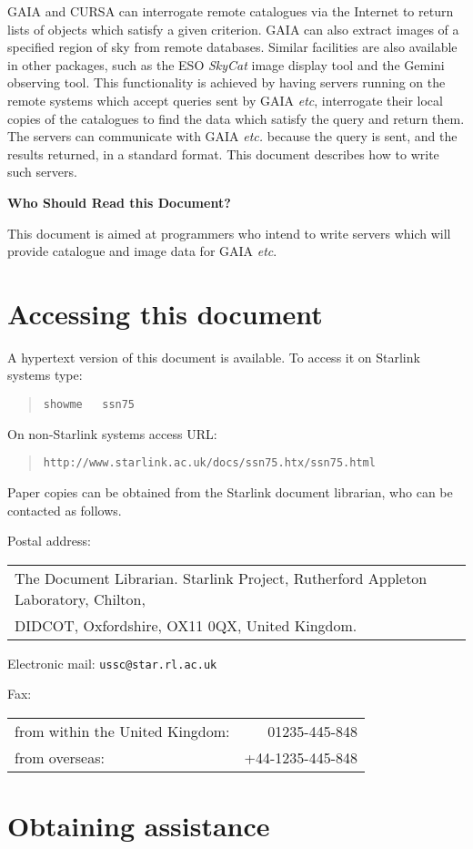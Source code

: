 \documentclass[twoside,11pt]{article}
\newcommand{\stardocabstract}
{GAIA and CURSA can interrogate remote catalogues via the Internet to
return lists of objects which satisfy a given criterion.  GAIA can also
extract images of a specified region of sky from remote databases.
Similar facilities are also available in other packages, such as the
ESO {\it SkyCat}\/ image display tool and the Gemini observing tool.
This functionality is achieved by having servers running on the remote
systems which accept queries sent by GAIA \emph{etc}, interrogate their
local copies of the catalogues to find the data which satisfy the query
and return them.  The servers can communicate with GAIA \emph{etc.} because
the query is sent, and the results returned, in a standard format.  This
document describes how to write such servers.

\begin{latexonly}
\vspace{5mm}
\end{latexonly}

\begin{center}
{\bf Who Should Read this Document?}
\end{center}

This document is aimed at programmers who intend to write servers which
will provide catalogue and image data for GAIA \emph{etc}.}
\newcommand{\htmladdnormallink}[2]{#1}
\newenvironment{latexonly}{}{}
\renewcommand{\_}{\texttt{\symbol{95}}}
\begin{document}
\stardocabstract

\newpage
\section*{Accessing this document}

A hypertext version of this document is available.  To access it on
Starlink systems type:

\begin{quote}
{\tt showme ~ ssn75}
\end{quote}

On non-Starlink systems access URL:

\begin{quote}
\htmladdnormallink{
{\tt http://www.starlink.ac.uk/docs/ssn75.htx/ssn75.html}}
{http://www.starlink.ac.uk/docs/ssn75.htx/ssn75.html}
\end{quote}

Paper copies can be obtained from the Starlink document librarian,
who can be contacted as follows.

Postal address: \\
\begin{tabular}{l}
The Document Librarian. Starlink Project, Rutherford Appleton Laboratory,
  Chilton, \\
DIDCOT, Oxfordshire, OX11 0QX, United Kingdom.                \\
\end{tabular}


Electronic mail: {\tt ussc@star.rl.ac.uk}


Fax: \\
\begin{tabular}{lr}
from within the United Kingdom: &    01235-445-848 \\
from overseas:                  & +44-1235-445-848 \\
\end{tabular}


\section*{Obtaining assistance}
\end{document}

